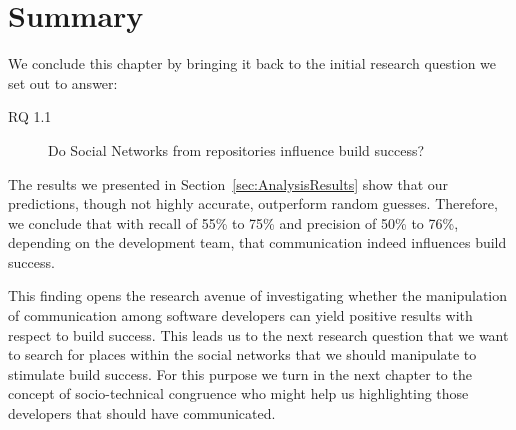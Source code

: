 \section{Summary}
\label{sec:conclusion}
We conclude this chapter by bringing it back to the initial research question we set out to answer:
\begin{description}
\item[RQ 1.1] Do Social Networks from repositories influence build success?
\end{description}

The results we presented in Section~\ref{sec:AnalysisResults} show that our predictions, though not highly accurate, outperform random guesses.
Therefore, we conclude that with recall of 55\% to 75\% and precision of 50\% to 76\%, depending on the development team, that communication indeed influences build success.

This finding opens the research avenue of investigating whether the manipulation of communication among software developers can yield positive results with respect to build success.
This leads us to the next research question that we want to search for places within the social networks that we should manipulate to stimulate build success.
For this purpose we turn in the next chapter to the concept of socio-technical congruence who might help us highlighting those developers that should have communicated.

